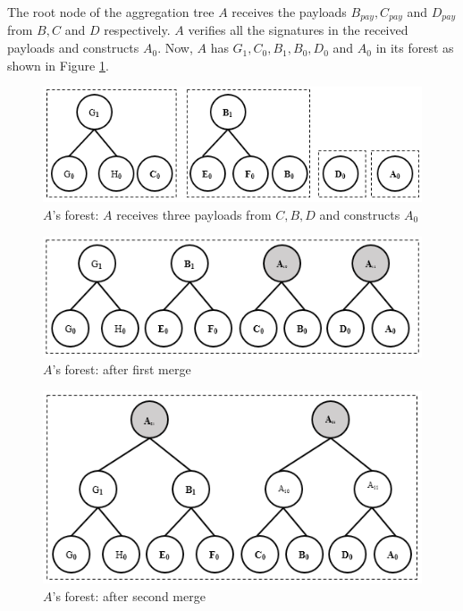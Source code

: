 	The root node of the aggregation tree $A$ receives the payloads $B_{pay}, C_{pay}$ and $D_{pay}$ from $B,C$ and $D$ respectively.
	$A$ verifies all the signatures in the received payloads and constructs $A_{0}$.
	Now, $A$ has $G_{1},C_{0},B_{1},B_{0},D_{0}$ and $A_{0}$ in its forest as shown in Figure \ref{fig:a-forest}.
	\begin{figure}[h!]
		\centering
		\includegraphics{images/a-forest.png}
		\caption{$A$'s forest: $A$ receives three payloads from $C,B,D$ and constructs $A_{0}$}
		\label{fig:a-forest}
	\end{figure}
	\begin{figure}[h!]
		\centering
		\includegraphics{images/a-forest-first-merge.png}
		\caption{$A$'s forest: after first merge}
		\label{fig:a-forest-first-merge}
	\end{figure}
	\begin{figure}[h!]
		\centering
		\includegraphics{images/a-forest-second-merge.png}
		\caption{$A$'s forest: after second merge}
		\label{fig:a-forest-second-merge}
	\end{figure}
